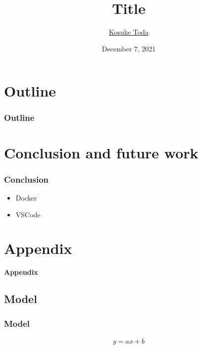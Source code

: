 \documentclass[aspectratio=169, unicode, 14pt]{beamer}
\title[short title]{Title}
\author{\underline{Kosuke Toda}} %
\institute[]
{
Graduate School of Engineering Science, Osaka University
}
\date{December 7, 2021} %
\begin{document}
\begin{frame}
\frametitle{}
\titlepage
\end{frame}


\section*{Outline}
\begin{frame}[t]\frametitle{Outline}
\tableofcontents
\end{frame}

\section{Conclusion and future work}
\begin{frame}[t]\frametitle{Conclusion}
  \begin{itemize}
    \item Docker
    \item VSCode
  \end{itemize}
\end{frame}

\backupbegin

\section*{Appendix}
\begin{frame}
  \textbf{\LARGE{Appendix}}
\end{frame}

\subsection*{Model}
\begin{frame}[t]\frametitle{Model}
  \begin{align}
  y = ax + b \nonumber
  \end{align}
\end{frame}


\backupend
\end{document}
